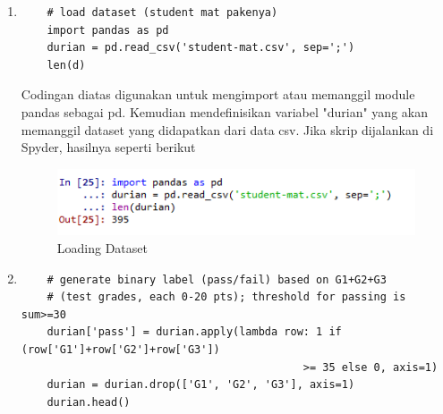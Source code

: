 \begin{enumerate}

\item
\begin{verbatim}
	# load dataset (student mat pakenya)
	import pandas as pd
	durian = pd.read_csv('student-mat.csv', sep=';')
	len(d)
\end{verbatim}

\par
Codingan diatas digunakan untuk mengimport atau memanggil module pandas sebagai pd. Kemudian mendefinisikan variabel "durian" yang akan memanggil dataset yang didapatkan dari data csv. Jika skrip dijalankan di Spyder, hasilnya seperti berikut 
\begin{figure}[ht]
\centering
\includegraphics[scale=0.5]{figures/spyder1.png}
\caption{Loading Dataset}
\label{Spyder}
\end{figure}
\item
\begin{verbatim}
	# generate binary label (pass/fail) based on G1+G2+G3 
	# (test grades, each 0-20 pts); threshold for passing is sum>=30
	durian['pass'] = durian.apply(lambda row: 1 if (row['G1']+row['G2']+row['G3']) 
											>= 35 else 0, axis=1)
	durian = durian.drop(['G1', 'G2', 'G3'], axis=1)
	durian.head()
\end{verbatim}


\end{enumerate}
